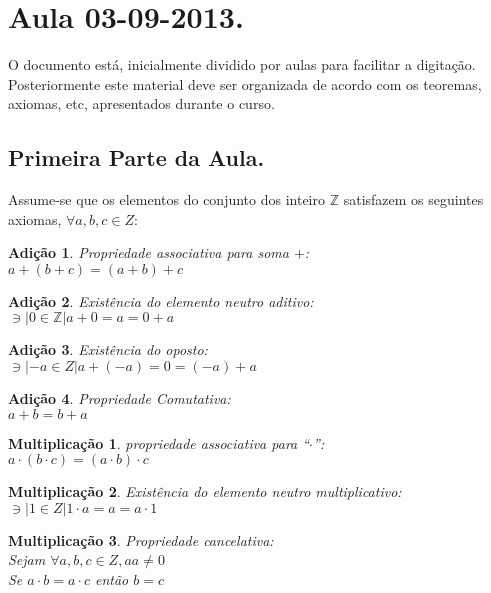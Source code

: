 \documentclass[a4paper,12pt]{article}
\newtheorem{add}{Adição}
\newtheorem{mult}{Multiplicação}
\begin{document}
\section{Aula 03-09-2013.}

O documento está, inicialmente dividido por aulas para facilitar a digitação. Posteriormente este material deve ser organizada de acordo com os teoremas, axiomas, etc, apresentados durante o curso.

\subsection{Primeira Parte da  Aula.}

Assume-se que os elementos do conjunto dos inteiro $\mathbb{Z}$ satisfazem os seguintes axiomas, $\forall a, b, c \in Z$:

\begin{add} %
  Propriedade associativa para soma $+$:\\
  $a + (b + c) = (a + b) + c$
\end{add}

\begin{add} %
  Existência do elemento neutro aditivo:\\
  $\ni |0 \in \mathbb{Z}| a + 0 = a = 0 + a$ %
\end{add}

\begin{add} %
  Existência do oposto:\\
  $\ni |-a \in Z| a + (-a) = 0 = (-a) + a$ %
\end{add}

\begin{add} %
  Propriedade Comutativa:\\
  $a + b = b + a$ %
\end{add}

\begin{mult} %
  propriedade associativa para ``$\cdot$'':\\
  $a \cdot (b \cdot c) =  (a \cdot b) \cdot c$
\end{mult}

\begin{mult} %
  Existência do elemento neutro multiplicativo:\\
  $\ni |1 \in Z| 1 \cdot a = a = a \cdot 1$ %
\end{mult}

\begin{mult} %
  Propriedade cancelativa:\\
  Sejam $\forall a, b, c \in Z, a a \neq 0$\\
  Se $a \cdot b = a \cdot c$ então $b = c$
\end{mult}
\end{document}
